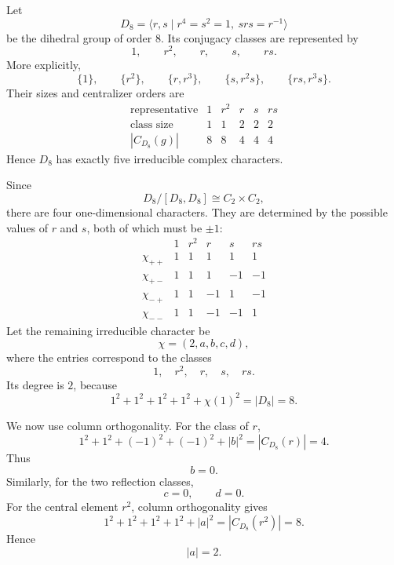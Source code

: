 \begin{example}
    Let
    \[
        D_8=\langle r,s\mid r^4=s^2=1,\ srs=r^{-1}\rangle
    \]
    be the dihedral group of order \(8\). Its conjugacy classes are represented by
    \[
        1,\qquad r^2,\qquad r,\qquad s,\qquad rs.
    \]
    More explicitly,
    \[
        \{1\},\qquad
        \{r^2\},\qquad
        \{r,r^3\},\qquad
        \{s,r^2s\},\qquad
        \{rs,r^3s\}.
    \]
    Their sizes and centralizer orders are
    \[
        \begin{array}{c|ccccc}
            \text{representative} & 1 & r^2 & r & s & rs\\
            \hline
            \text{class size} & 1 & 1 & 2 & 2 & 2\\
            |C_{D_8}(g)| & 8 & 8 & 4 & 4 & 4
        \end{array}
    \]
    Hence \(D_8\) has exactly five irreducible complex characters.

    Since
    \[
        D_8/[D_8,D_8]\cong C_2\times C_2,
    \]
    there are four one-dimensional characters. They are determined by the
    possible values of \(r\) and \(s\), both of which must be \(\pm 1\):
    \[
        \begin{array}{c|ccccc}
            & 1 & r^2 & r & s & rs\\
            \hline
            \chi_{++} & 1 & 1 & 1 & 1 & 1\\
            \chi_{+-} & 1 & 1 & 1 & -1 & -1\\
            \chi_{-+} & 1 & 1 & -1 & 1 & -1\\
            \chi_{--} & 1 & 1 & -1 & -1 & 1
        \end{array}
    \]
    Let the remaining irreducible character be
    \[
        \chi=(2,a,b,c,d),
    \]
    where the entries correspond to the classes
    \[
        1,\quad r^2,\quad r,\quad s,\quad rs.
    \]
    Its degree is \(2\), because
    \[
        1^2+1^2+1^2+1^2+\chi(1)^2=|D_8|=8.
    \]

    We now use column orthogonality. For the class of \(r\),
    \[
        1^2+1^2+(-1)^2+(-1)^2+|b|^2
        =
        |C_{D_8}(r)|
        =
        4.
    \]
    Thus
    \[
        b=0.
    \]
    Similarly, for the two reflection classes,
    \[
        c=0,
        \qquad
        d=0.
    \]
    For the central element \(r^2\), column orthogonality gives
    \[
        1^2+1^2+1^2+1^2+|a|^2
        =
        |C_{D_8}(r^2)|
        =
        8.
    \]
    Hence
    \[
        |a|=2.
    \]


\end{example}
